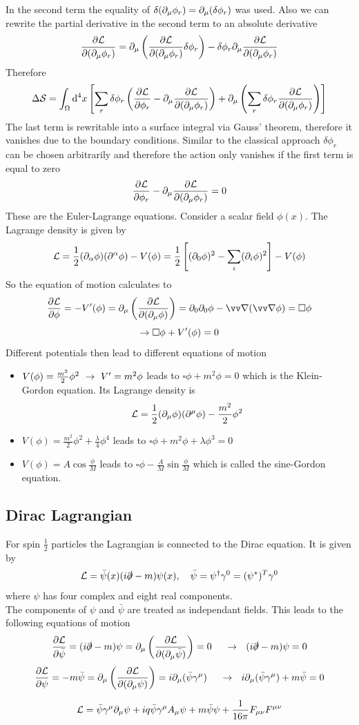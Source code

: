 In the second term the equality of $\delta (\partial _\mu \phi_r) = \partial_\mu(\delta \phi_r)$ was used. Also we can rewrite the partial derivative in the second term to an absolute derivative
\[
\frac{\partial \mathcal{L}}{\partial(\partial_\mu \phi_r)} = \partial_\mu \left( \frac{\partial \mathcal{L}}{\partial ( \partial_\mu \phi_r)} \delta\phi_r\right) - \delta \phi_r \partial_\mu \frac{\partial \mathcal{L}}{\partial(\partial_\mu \phi_r)}
\]
Therefore
\[
\Delta \mathcal{S} = \int_\Omega {\rm d} ^4 x \left[ \sum_r \delta \phi_r \left( \frac{\partial \mathcal{L}}{\partial \phi_r} - \partial_\mu \frac{\partial \mathcal{L}}{\partial(\partial_\mu \phi_r)}\right) + \partial_\mu \left( \sum_r \delta \phi_r \frac{\partial \mathcal{L}}{\partial(\partial_\mu \phi_r)} \right)\right]
\]
The last term is rewritable into a surface integral via Gauss' theorem, therefore it vanishes due to the boundary conditions. Similar to the classical approach $\delta \phi_r$ can be chosen arbitrarily and therefore the action only vanishes if the first term is equal to zero
\[ 
\frac{\partial \mathcal{L}}{\partial \phi_r} - \partial_\mu \frac{\partial \mathcal{L}}{\partial(\partial_\mu \phi_r)} = 0
\]
These are the Euler-Lagrange equations.
Consider a scalar field $\phi(x)$. The Lagrange density is given by
\[ \mathcal{L} = \frac{1}{2} (\partial_\alpha \phi)(\partial^\alpha \phi) - V(\phi) = \frac{1}{2} \left[ (\partial_0\phi)^2 - \sum_i (\partial_i \phi)^2\right]-V(\phi)\]
So the equation of motion calculates to
\[ \frac{\p \LL}{\p \phi} = - V'(\phi) = \p_\mu \left( \frac{\p \LL}{\p(\p_\mu \phi)}\right) = \p_0 \p_0 \phi - \vn(\vn \phi) = \square \phi\]
\[\rightarrow \square \phi + V'(\phi) = 0\]
Different potentials then lead to different equations of motion
\begin{itemize}
\item $V(\phi) = \frac{m^2}{2}\phi^2 ~\rightarrow~ V' = m^2\phi$ leads to $\square\phi + m^2 \phi = 0$
which is the Klein-Gordon equation. Its Lagrange density is
\[ \mathcal{L} = \frac{1}{2} (\partial_\mu \phi)(\partial^\mu \phi) - \frac{m^2}{2}\phi^2\]
\item $V(\phi) = \frac{m^2}{2}\phi^2 + \frac{\lambda}{4}\phi^4$ leads to $\square \phi + m^2 \phi + \lambda \phi^3  = 0$
\item $V(\phi) = A \cos \frac{\phi}{M}$ leads to $\square\phi - \frac{A}{M} \sin \frac{\phi}{M}$
which is called the sine-Gordon equation.
\end{itemize}

\subsection{Dirac Lagrangian}
For spin $\frac{1}{2}$ particles the Lagrangian is connected to the Dirac equation. It is given by
\[ \mathcal{L} = \bar{\psi}(x)(i \slashed{\partial} - m) \psi(x),~~~\bar{\psi} = \psi^\dagger \gamma^0 = (\psi^*)^T \gamma^0\]
where $\psi$ has four complex and eight real components.\\
The components of $\psi$ and $\bar{\psi}$ are treated as independant fields. This leads to the following equations of motion
\[ \frac{\partial \mathcal{L}}{\partial \bar{\psi}} = ( i \slashed{\partial} - m)\psi = \partial_\mu \left( \frac{\partial \mathcal{L}}{\partial(\partial_\mu \bar{\psi})}\right) = 0~~~~\rightarrow ~~ (i \slashed{\partial} - m) \psi = 0\]
\[ \frac{\partial\mathcal{L}}{\partial\psi} = -m \bar{\psi} = \partial_\mu\left( \frac{\partial\mathcal{L}}{\partial(\partial_\mu \psi)}\right) = i \partial_\mu(\bar{\psi}\gamma^\mu)~~~~\rightarrow ~~ i \partial_\mu(\bar{\psi}\gamma^\mu) + m \bar{\psi} = 0\]


\[
\mathcal{L} = \bar{\psi} \gamma^\mu \partial_\mu \psi + i q \bar{\psi} \gamma^\mu A_\mu \psi + m \bar{\psi}\psi + \frac{1}{16 \pi} F_{\mu\nu}F^{\mu\nu}
\] 
